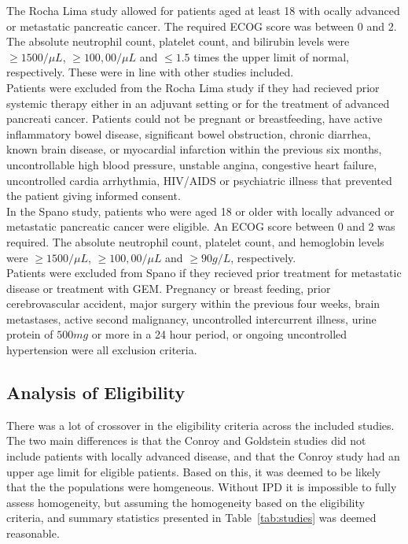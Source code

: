 The Rocha Lima study allowed for patients aged at least 18 with ocally advanced or metastatic pancreatic cancer. The required ECOG score was between 0 and 2. The absolute neutrophil count, platelet count, and bilirubin levels were $\geq 1500/\mu L$, $\geq 100,00/\mu L$ and $\leq 1.5$ times the upper limit of normal, respectively. These were in line with other studies included. \\

Patients were excluded from the Rocha Lima study if they had recieved prior systemic therapy either in an adjuvant setting or for the treatment of advanced pancreati cancer. Patients could not be pregnant or breastfeeding, have active inflammatory bowel disease, significant bowel obstruction, chronic diarrhea, known brain disease, or myocardial infarction within the previous six months, uncontrollable high blood pressure, unstable angina, congestive heart failure, uncontrolled cardia arrhythmia, HIV/AIDS or psychiatric illness that prevented the patient giving informed consent. \\

In the Spano study, patients who were aged 18 or older with locally advanced or metastatic pancreatic cancer were eligible. An ECOG score between 0 and 2 was required. The absolute neutrophil count, platelet count, and hemoglobin levels were $\geq 1500/\mu L$, $\geq 100,00/\mu L$ and $\geq 90g/L$, respectively. \\

Patients were excluded from Spano if they recieved prior treatment for metastatic disease or treatment with GEM. Pregnancy or breast feeding, prior cerebrovascular accident, major surgery within the previous four weeks, brain metastases, active second malignancy, uncontrolled intercurrent illness, urine protein of $500mg$ or more in a 24 hour period, or ongoing uncontrolled hypertension were all exclusion criteria.

\subsection{Analysis of Eligibility}
There was a lot of crossover in the eligibility criteria across the included studies. The two main differences is that the Conroy and Goldstein studies did not include patients with locally advanced disease, and that the Conroy study had an upper age limit for eligible patients. Based on this, it was deemed to be likely that the the populations were homgeneous. Without IPD it is impossible to fully assess homogeneity, but assuming the homogeneity based on the eligibility criteria, and summary statistics presented in Table~\ref{tab:studies} was deemed reasonable.

